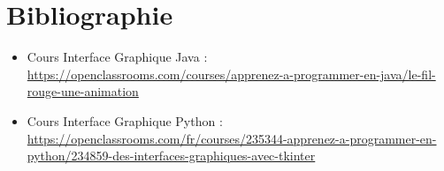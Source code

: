 \documentclass[a4paper]{report}
\begin{document}

\chapter{Bibliographie}

\begin{itemize}
    \item Cours Interface Graphique Java :
    \url{https://openclassrooms.com/courses/apprenez-a-programmer-en-java/le-fil-rouge-une-animation}
    \item Cours Interface Graphique Python : 
    \url{https://openclassrooms.com/fr/courses/235344-apprenez-a-programmer-en-python/234859-des-interfaces-graphiques-avec-tkinter}
    
\end{itemize}


\end{document}
